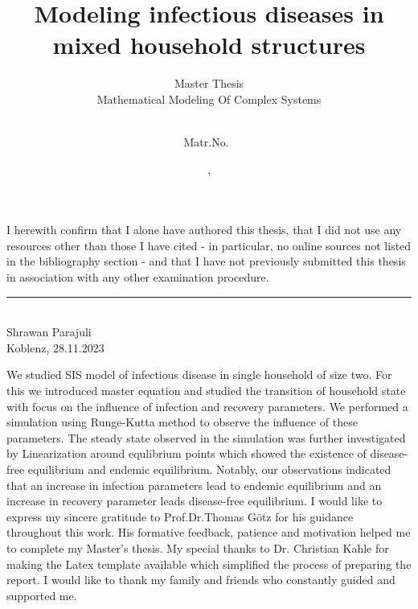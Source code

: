 \documentclass[paper=a4, fontsize=11pt, twoside, BCOR=12mm, parskip=full, listof=totoc]{scrreprt}
\subtitle{\vspace*{1cm}Master Thesis\\Mathematical Modeling Of Complex Systems\vspace*{1cm}}
\title{Modeling infectious diseases in mixed household structures}
\author{\myname\\Matr.No.~\mystudno}
\date{\myplace, \submissiondate}
\newcommand{\myname}{Shrawan Parajuli}
\newcommand{\myplace}{Koblenz}
\newcommand{\submissiondate}{28.11.2023}
\begin{document}
\maketitle
{}
 
I herewith confirm that I alone have authored this thesis, that I did not use any resources other than those I have cited - in particular, no online sources not listed in the bibliography section - and that I have not previously submitted this thesis in association with any other examination procedure.\\

\vspace*{2cm}
\rule{3.5cm}{.5pt}\\
\myname\\
\myplace, \submissiondate

We studied SIS model of infectious disease in single household of size two. For 		this we introduced master equation and studied the transition of household state  with focus on the influence of infection and recovery parameters. We performed a simulation using Runge-Kutta method to observe the influence of these parameters. The steady state observed in the simulation was further investigated by Linearization around equlibrium points which showed the existence of disease-free equilibrium and endemic equilibrium. Notably, our observations indicated that an increase in infection parameters lead to endemic equilibrium and an increase in recovery parameter leads disease-free equilibrium. 
I would like to express my sincere gratitude to Prof.Dr.Thomas Götz for his guidance throughout this work. His formative feedback, patience and motivation helped me to complete my Master’s thesis. 
My special thanks to Dr. Christian Kahle for making the Latex template available which simplified the process of preparing the report.
I would like to thank my family and friends who constantly guided and supported me.
\newpage
{}
\tableofcontents
\newpage
\listoftables
\cleardoublepage
\listoffigures

%
\setlength{\parindent}{0pt}

\newtheorem{definition}{Definition}[section]
\end{document}
